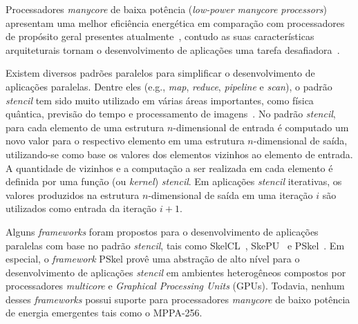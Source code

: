 \documentclass[12pt]{article}
\newcommand{\fw}{\textit{framework}\xspace}
\newcommand{\fws}{\textit{frameworks}\xspace}
\newcommand{\mppa}{MPPA-256\xspace}
\newcommand{\stencil}{\textit{stencil}\xspace}
\begin{document}
Processadores \textit{manycore} de baixa potência (\textit{low-power manycore
    processors}) apresentam uma melhor eficiência energética em comparação com
processadores de propósito geral presentes
atualmente~\cite{Castro-IA3-JPDC:2014}, contudo as suas características
arquiteturais tornam o desenvolvimento de aplicações uma tarefa
desafiadora~\cite{Varghese14,Castro-PARCO:2016,Castro-SBAC-PAD:2014}.
%

Existem diversos padrões paralelos para simplificar o desenvolvimento de
aplicações paralelas. Dentre eles (e.g., \textit{map}, \textit{reduce},
\textit{pipeline} e \textit{scan}), o padrão \stencil tem sido muito utilizado
em várias áreas importantes, como física quântica, previsão do tempo e
processamento de imagens~\cite{gonzalez06,holewinski12,lutz13}. No padrão
\stencil, para cada elemento de uma estrutura $n$-dimensional de entrada é
computado um novo valor para o respectivo elemento em uma estrutura
$n$-dimensional de saída, utilizando-se como base os valores dos elementos
vizinhos ao elemento de entrada. A quantidade de vizinhos e a computação a ser
realizada em cada elemento é definida por uma função (ou \textit{kernel})
\stencil. Em aplicações \stencil iterativas, os valores produzidos na estrutura
$n$-dimensional de saída em uma iteração $i$ são utilizados como entrada da
iteração $i+1$.

Alguns \fws foram propostos para o desenvolvimento de aplicações paralelas com
base no padrão \stencil, tais como SkelCL~\cite{steuwer11},
SkePU~\cite{enmyren10} e PSkel~\cite{pereira15}. Em especial, o \fw PSkel provê
uma abstração de alto nível para o desenvolvimento de aplicações \stencil em
ambientes heterogêneos compostos por processadores \textit{multicore} e
\textit{Graphical Processing Units} (GPUs). Todavia, nenhum desses \fws possui
suporte para processadores \textit{manycore} de baixo potência de energia
emergentes tais como o \mppa.
\end{document}
